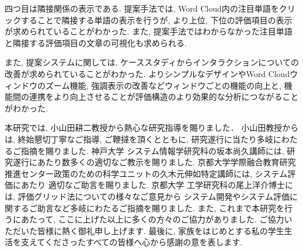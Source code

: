 \documentclass[syuuron]{kuee}
\begin{document}
		四つ目は隣接関係の表示である. 
		提案手法では, Word Cloud内の注目単語をクリックすることで隣接する単語の表示を行うが, 
		より上位, 下位の評価項目の表示が求められていることがわかった. 
		また, 提案手法ではわからなかった注目単語と隣接する評価項目の文章の可視化も求められる. 
		
		また, 提案システムに関しては, ケーススタディからインタラクションについての改善が求められていることがわかった. 
		よりシンプルなデザインやWord Cloudウィンドウのズーム機能, 強調表示の改善などウィンドウごとの機能の向上と, 
		機能間の連携をより向上させることが評価構造のより効果的な分析につながることがわかった. 

\begin{acknowledgements}
	本研究では, 小山田耕二教授から熱心な研究指導を賜りました．
	小山田教授からは, 終始懇切丁寧なご指導, ご鞭撻を頂くとともに, 研究遂行に当たり多岐にわたるご指摘を賜りました. 
	神戸大学 システム情報学研究科の坂本尚久講師には, 研究遂行にあたり数多くの適切なご教示を賜りました.
	京都大学学際融合教育研究推進センター政策のための科学ユニットの久木元伸如特定講師には, システム評価にあたり
	適切なご助言を賜りました. 
	京都大学 工学研究科の尾上洋介博士には, 評価グリッド法についての様々なご意見から
	システム開発やシステム評価に関するご助言など多岐にわたるご指摘を賜りました. 
	また, これまで本研究を行うにあたって, ここに上げた以上に多くの方々のご協力がありました. 
	ご協力いただいた皆様に熱く御礼申し上げます. 
	最後に, 家族をはじめとする私の学生生活を支えてくださったすべての皆様へ心から感謝の意を表します. 
\end{acknowledgements}
\end{document}
